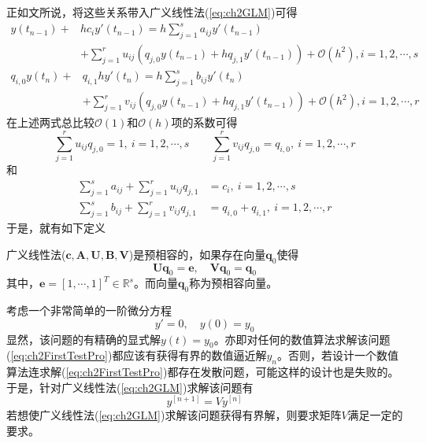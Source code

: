 正如文所说，将这些关系带入广义线性法(\ref{eq:ch2GLM})可得
\begin{equation}
\begin{aligned}
y(t_{n-1})+&hc_iy'(t_{n-1})=h\sum_{j=1}^{s}a_{ij}y'(t_{n-1})\\
&+\sum_{j=1}^{r}u_{ij}\left(q_{j,0}y(t_{n-1})+hq_{j,1}y'(t_{n-1})\right)+\mathcal{O}(h^2),i=1,2,\cdots,s
\end{aligned}
\end{equation}\vspace{-0.5cm}
\begin{equation}
\begin{aligned}
q_{i,0}y(t_{n})+&q_{i,1}hy'(t_{n})=h\sum_{j=1}^{s}b_{ij}y'(t_{n})\\
&+\sum_{j=1}^{r}v_{ij}\left(q_{j,0}y(t_{n-1})+hq_{j,1}y'(t_{n-1})\right)+\mathcal{O}(h^2),i=1,2,\cdots,r
\end{aligned}
\end{equation}
在上述两式总比较$\mathcal{O}(1)$和$\mathcal{O}(h)$项的系数可得
\begin{equation}
\sum_{j=1}^{r}u_{ij}q_{j,0}=1,\ i=1,2,\cdots,s\qquad \sum_{j=1}^{r}v_{ij}q_{j,0}=q_{i,0},\ i = 1,2,\cdots,r
\end{equation}
和
\begin{subequations}
\begin{align}
\sum_{j=1}^{s}a_{ij}+\sum_{j=1}^{r}u_{ij}q_{j,1}&=c_i,\ i=1,2,\cdots,s\\
\sum_{j=1}^{s}b_{ij}+\sum_{j=1}^{r}v_{ij}q_{j,1}&=q_{i,0}+q_{i,1},\ i=1,2,\cdots,r
\end{align}
\end{subequations}
于是，就有如下定义
\begin{definition}[预相容]
广义线性法($\bm{c,A,U,B,V}$)是预相容的\cite{Jackiewicz2009,Burrage1995,Butcher2008}，如果存在向量$\bm{q}_0$使得
\begin{equation}
\bm{Uq}_0=\bm{e},\quad \bm{Vq}_0=\bm{q}_0\label{eq:ch2PreConsistent}
\end{equation}
其中，$\bm{e}=[1,\cdots,1]^T\in\mathbb{R}^s$。而向量$\bm{q}_0$称为预相容向量。
\end{definition}










考虑一个非常简单的一阶微分方程
\begin{equation}
y'=0,\quad y(0)=y_0\label{eq:ch2FirstTestPro}
\end{equation}
显然，该问题的有精确的显式解$y(t)=y_0$。亦即对任何的数值算法求解该问题(\ref{eq:ch2FirstTestPro})都应该有获得有界的数值逼近解$y_n$。否则，若设计一个数值算法连求解(\ref{eq:ch2FirstTestPro})都存在发散问题，可能这样的设计也是失败的。于是，针对广义线性法(\ref{eq:ch2GLM})求解该问题有
\begin{equation}
y^{[n+1]}=Vy^{[n]}
\end{equation}
若想使广义线性法(\ref{eq:ch2GLM})求解该问题获得有界解，则要求矩阵$V$满足一定的要求。








